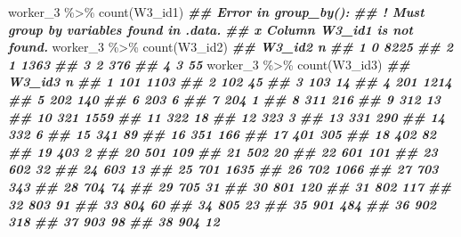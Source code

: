 \documentclass[
]{book}
\newenvironment{Shaded}{\begin{snugshade}}{\end{snugshade}}
\newcommand{\DocumentationTok}[1]{\textcolor[rgb]{0.56,0.35,0.01}{\textbf{\textit{#1}}}}
\newcommand{\FunctionTok}[1]{\textcolor[rgb]{0.00,0.00,0.00}{#1}}
\newcommand{\NormalTok}[1]{#1}
\newcommand{\SpecialCharTok}[1]{\textcolor[rgb]{0.00,0.00,0.00}{#1}}
\theoremstyle{definition}
\theoremstyle{definition}
\theoremstyle{definition}
\theoremstyle{definition}
\theoremstyle{remark}
\begin{document}
\begin{Shaded}
\begin{Highlighting}[]
\NormalTok{worker\_3 }\SpecialCharTok{\%\textgreater{}\%} 
  \FunctionTok{count}\NormalTok{(W3\_id1)}
\DocumentationTok{\#\# Error in \textasciigrave{}group\_by()\textasciigrave{}:}
\DocumentationTok{\#\# ! Must group by variables found in \textasciigrave{}.data\textasciigrave{}.}
\DocumentationTok{\#\# x Column \textasciigrave{}W3\_id1\textasciigrave{} is not found.}
\NormalTok{worker\_3 }\SpecialCharTok{\%\textgreater{}\%} 
  \FunctionTok{count}\NormalTok{(W3\_id2)}
\DocumentationTok{\#\#   W3\_id2    n}
\DocumentationTok{\#\# 1      0 8225}
\DocumentationTok{\#\# 2      1 1363}
\DocumentationTok{\#\# 3      2  376}
\DocumentationTok{\#\# 4      3   55}
\NormalTok{worker\_3 }\SpecialCharTok{\%\textgreater{}\%} 
  \FunctionTok{count}\NormalTok{(W3\_id3)}
\DocumentationTok{\#\#    W3\_id3    n}
\DocumentationTok{\#\# 1     101 1103}
\DocumentationTok{\#\# 2     102   45}
\DocumentationTok{\#\# 3     103   14}
\DocumentationTok{\#\# 4     201 1214}
\DocumentationTok{\#\# 5     202  140}
\DocumentationTok{\#\# 6     203    6}
\DocumentationTok{\#\# 7     204    1}
\DocumentationTok{\#\# 8     311  216}
\DocumentationTok{\#\# 9     312   13}
\DocumentationTok{\#\# 10    321 1559}
\DocumentationTok{\#\# 11    322   18}
\DocumentationTok{\#\# 12    323    3}
\DocumentationTok{\#\# 13    331  290}
\DocumentationTok{\#\# 14    332    6}
\DocumentationTok{\#\# 15    341   89}
\DocumentationTok{\#\# 16    351  166}
\DocumentationTok{\#\# 17    401  305}
\DocumentationTok{\#\# 18    402   82}
\DocumentationTok{\#\# 19    403    2}
\DocumentationTok{\#\# 20    501  109}
\DocumentationTok{\#\# 21    502   20}
\DocumentationTok{\#\# 22    601  101}
\DocumentationTok{\#\# 23    602   32}
\DocumentationTok{\#\# 24    603   13}
\DocumentationTok{\#\# 25    701 1635}
\DocumentationTok{\#\# 26    702 1066}
\DocumentationTok{\#\# 27    703  343}
\DocumentationTok{\#\# 28    704   74}
\DocumentationTok{\#\# 29    705   31}
\DocumentationTok{\#\# 30    801  120}
\DocumentationTok{\#\# 31    802  117}
\DocumentationTok{\#\# 32    803   91}
\DocumentationTok{\#\# 33    804   60}
\DocumentationTok{\#\# 34    805   23}
\DocumentationTok{\#\# 35    901  484}
\DocumentationTok{\#\# 36    902  318}
\DocumentationTok{\#\# 37    903   98}
\DocumentationTok{\#\# 38    904   12}
\end{Highlighting}
\end{Shaded}
\end{document}
